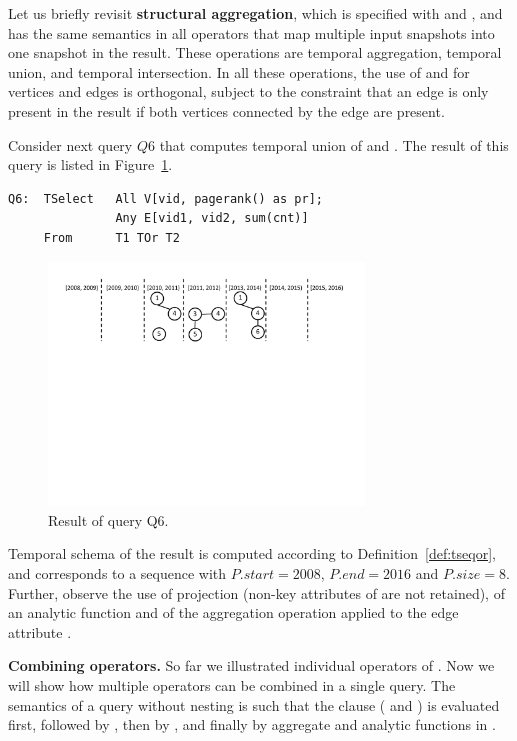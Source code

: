 Let us briefly revisit {\bf structural aggregation}, which is
specified with  and , and has the same semantics
in all \ql operators that map multiple input snapshots into one
snapshot in the result. These operations are temporal aggregation,
temporal union, and temporal intersection.  In all these operations,
the use of  and  for vertices and edges is
orthogonal, subject to the constraint that an edge is only present
in the result if both vertices connected by the edge are present.

Consider next query $Q6$ that computes temporal union of 
and .  The result of this query is listed in
Figure~\ref{fig:q6}.

\begin{verbatim}
Q6:  TSelect   All V[vid, pagerank() as pr]; 
               Any E[vid1, vid2, sum(cnt)]
     From      T1 TOr T2
\end{verbatim}

\begin{figure}
\centering
\includegraphics[width=3.3in]{figs/q6.pdf}
\caption{Result of query Q6.}
\label{fig:q6}
\end{figure}

Temporal schema of the result is computed according to
Definition~\ref{def:tseqor}, and corresponds to a sequence with
$P.start = 2008$, $P.end=2016$ and $P.size=8$.  Further, observe the
use of projection (non-key attributes of  are not retained),
of an analytic function  and of the aggregation
operation  applied to the edge attribute .

{\bf Combining operators.}  So far we illustrated individual operators
of \ql.  Now we will show how multiple operators can be combined in a
single query.  The semantics of a \ql query without nesting is such
that the  clause ( and ) is
evaluated first, followed by , then by ,
and finally by aggregate and analytic functions in .

